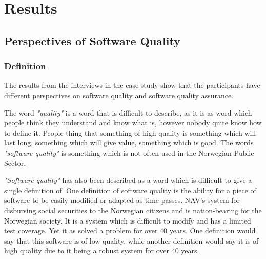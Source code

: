 \chapter{Results}

\section{Perspectives of Software Quality}

\subsection{Definition}
The results from the interviews in the case study show that the participants have different perspectives on software quality and software quality assurance.

The word \textit{"quality"} is a word that is difficult to describe, as it is as word which people think they understand and know what is, however nobody quite know how to define it. People thing that something of high quality is something which will last long, something which will give value, something which is good. The words \textit{"software quality"} is something which is not often used in the Norwegian Public Sector.

\textit{"Software quality"} has also been described as a word which is difficult to give a single definition of. One definition of software quality is the ability for a piece of software to be easily modified or adapted as time passes. NAV's system for disbursing social securities to the Norwegian citizens and is nation-bearing for the Norwegian society. It is a system which is difficult to modify and has a limited test coverage. Yet it as solved a problem for over 40 years. One definition would say that this software is of low quality, while another definition would say it is of high quality due to it being a robust system for over 40 years.



